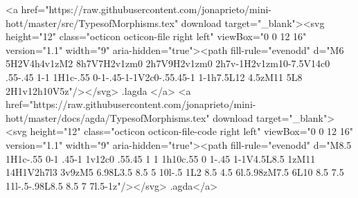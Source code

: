         <a href="https://raw.githubusercontent.com/jonaprieto/mini-hott/master/src/TypesofMorphisms.tex" download target="_blank"><svg height="12" class="octicon octicon-file right left" viewBox="0 0 12 16" version="1.1" width="9" aria-hidden="true"><path fill-rule="evenodd" d="M6 5H2V4h4v1zM2 8h7V7H2v1zm0 2h7V9H2v1zm0 2h7v-1H2v1zm10-7.5V14c0 .55-.45 1-1 1H1c-.55 0-1-.45-1-1V2c0-.55.45-1 1-1h7.5L12 4.5zM11 5L8 2H1v12h10V5z"/></svg> .lagda </a>
        <a href="https://raw.githubusercontent.com/jonaprieto/mini-hott/master/docs/agda/TypesofMorphisms.tex" download target="_blank"><svg height="12" class="octicon octicon-file-code right left" viewBox="0 0 12 16" version="1.1" width="9" aria-hidden="true"><path fill-rule="evenodd" d="M8.5 1H1c-.55 0-1 .45-1 1v12c0 .55.45 1 1 1h10c.55 0 1-.45 1-1V4.5L8.5 1zM11 14H1V2h7l3 3v9zM5 6.98L3.5 8.5 5 10l-.5 1L2 8.5 4.5 6l.5.98zM7.5 6L10 8.5 7.5 11l-.5-.98L8.5 8.5 7 7l.5-1z"/></svg> .agda</a>
      
